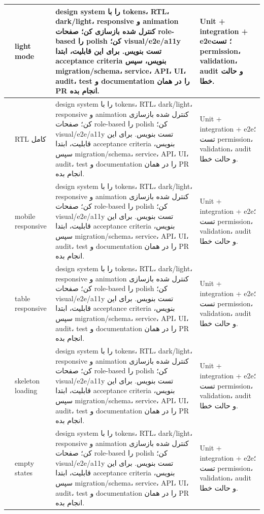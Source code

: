 \documentclass[11pt,a4paper]{article}
\begin{document}
\begin{longtable}{|>{\raggedleft\arraybackslash}p{}|>{\raggedleft\arraybackslash}p{}|>{\raggedleft\arraybackslash}p{}|>{\raggedleft\arraybackslash}p{}|}
272 & light mode & design system را با tokens، RTL، dark/light، responsive و animation کنترل شده بازسازی کن؛ صفحات role-based را polish کن؛ visual/e2e/a11y تست بنویس. برای این قابلیت، ابتدا acceptance criteria بنویس، سپس migration/schema، service، API، UI، audit، test و documentation را در همان PR انجام بده. & Unit + integration + e2e؛ تست permission، validation، audit و حالت خطا. \\ \hline
273 & RTL کامل & design system را با tokens، RTL، dark/light، responsive و animation کنترل شده بازسازی کن؛ صفحات role-based را polish کن؛ visual/e2e/a11y تست بنویس. برای این قابلیت، ابتدا acceptance criteria بنویس، سپس migration/schema، service، API، UI، audit، test و documentation را در همان PR انجام بده. & Unit + integration + e2e؛ تست permission، validation، audit و حالت خطا. \\ \hline
274 & mobile responsive & design system را با tokens، RTL، dark/light، responsive و animation کنترل شده بازسازی کن؛ صفحات role-based را polish کن؛ visual/e2e/a11y تست بنویس. برای این قابلیت، ابتدا acceptance criteria بنویس، سپس migration/schema، service، API، UI، audit، test و documentation را در همان PR انجام بده. & Unit + integration + e2e؛ تست permission، validation، audit و حالت خطا. \\ \hline
275 & table responsive & design system را با tokens، RTL، dark/light، responsive و animation کنترل شده بازسازی کن؛ صفحات role-based را polish کن؛ visual/e2e/a11y تست بنویس. برای این قابلیت، ابتدا acceptance criteria بنویس، سپس migration/schema، service، API، UI، audit، test و documentation را در همان PR انجام بده. & Unit + integration + e2e؛ تست permission، validation، audit و حالت خطا. \\ \hline
276 & skeleton loading & design system را با tokens، RTL، dark/light، responsive و animation کنترل شده بازسازی کن؛ صفحات role-based را polish کن؛ visual/e2e/a11y تست بنویس. برای این قابلیت، ابتدا acceptance criteria بنویس، سپس migration/schema، service، API، UI، audit، test و documentation را در همان PR انجام بده. & Unit + integration + e2e؛ تست permission، validation، audit و حالت خطا. \\ \hline
277 & empty states & design system را با tokens، RTL، dark/light، responsive و animation کنترل شده بازسازی کن؛ صفحات role-based را polish کن؛ visual/e2e/a11y تست بنویس. برای این قابلیت، ابتدا acceptance criteria بنویس، سپس migration/schema، service، API، UI، audit، test و documentation را در همان PR انجام بده. & Unit + integration + e2e؛ تست permission، validation، audit و حالت خطا. \\ \hline

\end{longtable}
\end{document}
